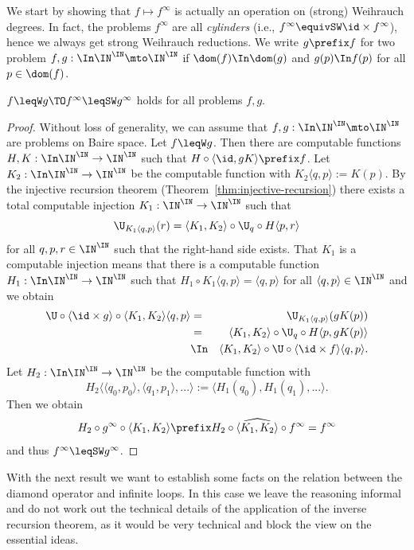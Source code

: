 \documentclass{lmcs}
\begin{document}
We start by showing that $f\mapsto f^\infty$ is actually an operation on (strong) Weihrauch degrees.
In fact, the problems $f^\infty$ are all {\em cylinders} (i.e., $f^\infty\equivSW\id\times f^\infty$), 
hence we always get strong Weihrauch reductions. We write $g\prefix f$ for two problem $f,g:\In\IN^\IN\mto\IN^\IN$
if $\dom(f)\In\dom(g)$ and $g(p)\In f(p)$ for all $p\in\dom(f)$.

\begin{prop}
\label{prop:monotonicity}
$f\leqW g\TO f^\infty\leqSW g^\infty$ holds for all problems $f,g$.
\end{prop}
\begin{proof}
Without loss of generality, we can assume that $f,g:\In\IN^\IN\mto\IN^\IN$ are problems on Baire space.
Let $f\leqW g$. Then there are computable functions $H,K:\In\IN^\IN\to\IN^\IN$ such that
$H\circ\langle\id, gK\rangle\prefix f$. 
Let $K_2:\In\IN^\IN\to\IN^\IN$ be the computable function
with $K_2\langle q,p\rangle:=K(p)$. 
By the injective recursion theorem (Theorem~\ref{thm:injective-recursion}) 
there exists a total computable injection $K_1:\IN^\IN\to\IN^\IN$ such that
\[\U_{K_1\langle q,p\rangle}(r)=\langle K_1, K_2\rangle\circ\U_q \circ H\langle p,r\rangle\]
for all $q,p,r\in\IN^\IN$ such that the right-hand side exists.
That $K_1$ is a computable injection means that there is a computable function $H_1:\In\IN^\IN\to\IN^\IN$ such that $H_1\circ K_1\langle q,p\rangle=\langle q,p\rangle$
for all $\langle q,p\rangle\in\IN^\IN$ and we obtain
\begin{eqnarray*}
\U\circ\langle\id\times g\rangle\circ \langle K_1, K_2\rangle\langle q,p\rangle
&=&\U_{K_1\langle q,p\rangle}(gK(p))\\
&=&\langle K_1,K_2\rangle\circ\U_q\circ H\langle p,gK(p)\rangle\\
&\In&\langle K_1, K_2\rangle\circ \U\circ\langle\id\times f\rangle\langle q,p\rangle.
\end{eqnarray*}
Let $H_2:\In\IN^\IN\to\IN^\IN$ be the computable function with 
\[H_2\langle\langle q_0,p_0\rangle,\langle q_1,p_1\rangle,...\rangle:=\langle H_1(q_0),H_1(q_1),...\rangle.\]
Then we obtain 
\[H_2\circ g^\infty\circ\langle K_1,K_2\rangle\prefix H_2\circ\widehat{\langle K_1,K_2\rangle}\circ f^\infty=f^\infty\]
and thus $f^\infty\leqSW g^\infty$.
\end{proof}

\noindent
With the next result we want to establish some facts on the relation between the diamond operator
and infinite loops. In this case we leave the reasoning informal and do not work out the 
technical details of the application of the inverse recursion theorem, as it would be very
technical and block the view on the essential ideas.
\end{document}
